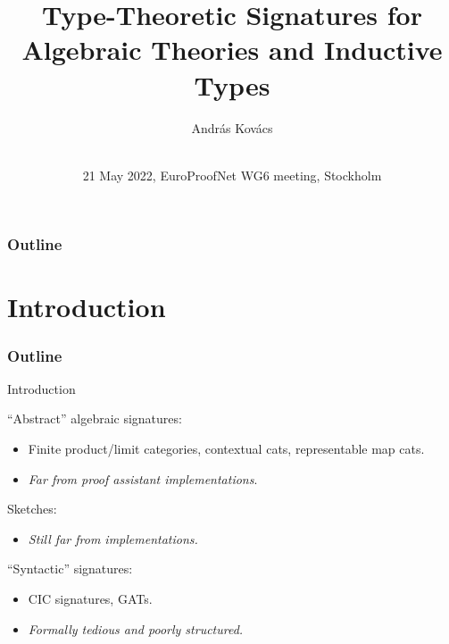\documentclass[dvipsnames]{beamer}
\title{Type-Theoretic Signatures for Algebraic Theories and Inductive Types}
\author{András Kovács\inst{1} \\ \vspace{0.5em}{\small j.w.w. Thorsten
    Altenkirch, Paolo Capriotti, Ambrus Kaposi, Ambroise Lafont, Christian
    Sattler} \\}
\institute{
  \inst{1}%
       {Eötvös Loránd University}
}
\date{21 May 2022, EuroProofNet WG6 meeting, Stockholm}
\begin{document}
\frame{\titlepage}

\begin{frame}
  \frametitle{Outline}
  \tableofcontents
\end{frame}

\section{Introduction}
\begin{frame}
  \frametitle{Outline}
  \tableofcontents[currentsection]
\end{frame}

\begin{frame}{Introduction}

``Abstract'' algebraic signatures:
  \begin{itemize}
    \item Finite product/limit categories, contextual cats, representable map cats.
    \item \emph{Far from proof assistant implementations}.
  \end{itemize}
\vspace{1em}

Sketches:
  \begin{itemize}
    \item \emph{Still far from implementations.}
  \end{itemize}
\vspace{1em}

``Syntactic'' signatures:
\begin{itemize}
  \item CIC signatures, GATs.
  \item \emph{Formally tedious and poorly structured.}
\end{itemize}
\vspace{1em}

\end{frame}
\end{document}
